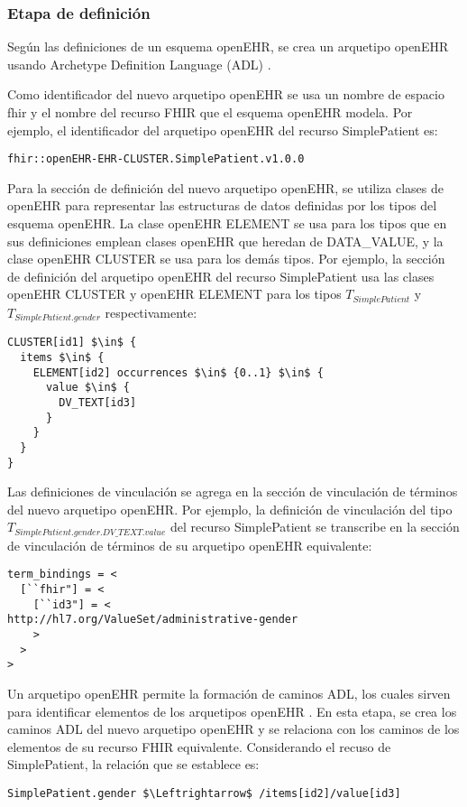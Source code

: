 \subsubsection{Etapa de definición}

Según las definiciones de un esquema openEHR, se crea un arquetipo openEHR usando Archetype Definition Language (ADL) \cite{openEHRADL}.

Como identificador del nuevo arquetipo openEHR se usa un nombre de espacio fhir y el nombre del recurso FHIR que el esquema openEHR modela. Por ejemplo, el identificador del arquetipo openEHR del recurso SimplePatient es:

\begin{lstlisting}
fhir::openEHR-EHR-CLUSTER.SimplePatient.v1.0.0
\end{lstlisting}

Para la sección de definición del nuevo arquetipo openEHR, se utiliza clases de openEHR para representar las estructuras de datos definidas por los tipos del esquema openEHR. La clase openEHR ELEMENT se usa para los tipos que en sus definiciones emplean clases openEHR que heredan de DATA\_VALUE, y la clase openEHR CLUSTER se usa para los demás tipos. Por ejemplo, la sección de definición del arquetipo openEHR del recurso SimplePatient usa las clases openEHR CLUSTER y openEHR ELEMENT para los tipos \(T_{SimplePatient}\) y \(T_{SimplePatient.gender}\) respectivamente:

\begin{lstlisting}[mathescape=true]
CLUSTER[id1] $\in$ {
  items $\in$ {
    ELEMENT[id2] occurrences $\in$ {0..1} $\in$ {
      value $\in$ {
        DV_TEXT[id3]
      }
    }
  }
}
\end{lstlisting}

Las definiciones de vinculación se agrega en la sección de vinculación de términos del nuevo arquetipo openEHR. Por ejemplo, la definición de vinculación del tipo \(T_{SimplePatient.gender.DV\_TEXT.value}\) del recurso SimplePatient se transcribe en la sección de vinculación de términos de su arquetipo openEHR equivalente:

\begin{lstlisting}
term_bindings = <
  [``fhir"] = <
    [``id3"] = <
http://hl7.org/ValueSet/administrative-gender
    >
  >
>
\end{lstlisting}

Un arquetipo openEHR permite la formación de caminos ADL, los cuales sirven para identificar elementos de los arquetipos openEHR \cite{openEHRArchitecture}. En esta etapa, se crea los caminos ADL del nuevo arquetipo openEHR y se relaciona con los caminos de los elementos de su recurso FHIR equivalente. Considerando el recuso de SimplePatient, la relación que se establece es:

\begin{lstlisting}[mathescape=true]
SimplePatient.gender $\Leftrightarrow$ /items[id2]/value[id3]
\end{lstlisting}
